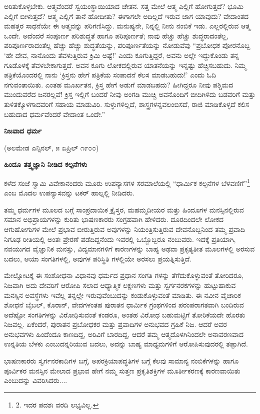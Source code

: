 ಅರಿತುಕೊಳ್ಳಬೇಕು. ಆತ್ಮವೆಂದರೆ ಸ್ವಯಂಸ್ಥಾಯಿಯಾದ ಚೇತನ. ಸತ್ತ ಮೇಲೆ ಆತ್ಮ ಎಲ್ಲಿಗೆ ಹೋಗುತ್ತದೆ? ಭೂಮಿ ಎಲ್ಲಿಗೆ ಬೀಳುತ್ತದೆ? ಆತ್ಮ ಎಲ್ಲಿಗೆ ತಾನೆ ಹೋದೀತು? ಈಗಾಗಲೇ ಅದಿಲ್ಲದೆ ಇರುವ ಜಾಗ ಯಾವುದು? ವೇದಾಂತದ ಮಹತ್ತರ ಸಾಧನೆಯೇ ಈ ಆತ್ಮವನ್ನು ಪರಿಗಣಿಸಿದ್ದು. ಮನುಷ್ಯನೇ, ನಿನ್ನಲ್ಲಿ ನೀನು ನಂಬಿಕೆ ಇಡು. ಎಲ್ಲರಲ್ಲಿರುವ ಆತ್ಮ ಒಂದೇ. ಅದೆಂದರೆ ಸಂಪೂರ್ಣ ಪರಿಶುದ್ಧತೆ ಹಾಗೂ ಪರಿಪೂರ್ಣತೆ; ನಾವು ಹೆಚ್ಚು ಹೆಚ್ಚು ಶುದ್ಧರಾದಂತೆಲ್ಲ, ಪರಿಪೂರ್ಣರಾದಂತೆಲ್ಲ ಹೆಚ್ಚು ಹೆಚ್ಚು ಶುದ್ಧತೆಯನ್ನು, ಪರಿಪೂರ್ಣತೆಯನ್ನು ನೋಡುವೆವು “ಪ್ರಬೋಧಕ ಪೋರನೊಬ್ಬ ‘ಹೇ ದೇವ, ನಾನೊಂದು ತೆವಳುತ್ತಿರುವ ಕ್ರಿಮಿ ಅಷ್ಟೆ!’ ಎಂದು ಕೂಗುತ್ತಿದ್ದರೆ, ಅವನು ಅಲ್ಲೇ ಇದ್ದುಕೊಂಡು ತನ್ನ ಗೂಡೊಳಕ್ಕೆ ತೆವಳಬೇಕಾಗುತ್ತದೆ. ಅವನ ಕೂಗು ಲೋಕದಲ್ಲಿರುವ ಯಾತನೆಯನ್ನು ಇನ್ನಷ್ಟು ಹೆಚ್ಚಿಸಬಹುದು. ನಿಮ್ಮ ಪತ್ರಿಕೆಯೊಂದರಲ್ಲಿ ನಾನು ‘ಕ್ರಿಸ್ತನು ಹೇಗೆ ಪತ್ರಿಕೆಯ ಸಂಪಾದನೆ ಕೆಲಸ ಮಾಡಬಹುದು!’ ಎಂದು ಓದಿ ನಗುವಂತಾಯಿತು. ಎಂತಹ ಮೂರ್ಖತನ, ಕ್ರಿಸ್ತ ಹೇಗೆ ಅಡುಗೆ ಮಾಡಬಹದು? ಹೀಗಿದ್ದರೂ ನೀವು ಪಶ್ಚಿಮದ ಮುಂದುವರೆದ ಜನರಲ್ಲವೆ! ಕ್ರಿಸ್ತ ಇಲ್ಲಿಗೆ ಬಂದರೆ ನೀವು ಅಂಗಡಿ ಮುಚ್ಚಿ ಅವನೊಂದಿಗೆ ಬೀದಿಗಿಳಿದು ಬಡವರಿಗೆ ಮತ್ತು ತುಳಿತಕ್ಕೊಳಗಾದವರಿಗೆ ಸಹಾಯ ಮಾಡುವಿರಿ. ಸುಳ್ಳುಗಳಿಲ್ಲದೆ, ಶಾಸ್ತ್ರಗಳನ್ನವಲಂಬಿಸದೆ, ರಾಜಿ ಮಾಡಿಕೊಳ್ಳದೆ ಕಲಿಸ ಬಹುದಾದ ಧರ್ಮವೆಂದರೆ ವೇದಾಂತ ಒಂದೇ.”

\begin{center}
\textbf{ನಿಜವಾದ ಧರ್ಮ}
\end{center}

\begin{center}
(ಅಲಮೇಡ ಎನ್ಸಿನಲ್, ೫ ಏಪ್ರಿಲ್ ೧೯೦೦)
\end{center}

\begin{center}
\textbf{ಹಿಂದೂ ತತ್ತ್ವಜ್ಞಾನಿ ನೀಡಿದ ಕಲ್ಪನೆಗಳು}
\end{center}

ಕಳೆದ ಸಂಜೆ ಸ್ವಾಮಿ ವಿವೇಕಾನಂದರು ಮೂರು ಉಪನ್ಯಾಸಗಳ ಸರಮಾಲೆಯಲ್ಲಿ “ಧಾರ್ಮಿಕ ಕಲ್ಪನೆಗಳ ಬೆಳವಣಿಗೆ”\footnote{2. ಇದರ ಪದಶಃ ವರದಿ ಲಭ್ಯವಿಲ್ಲ.} ಎಂಬ ಮೊದಲ ಉಪನ್ಯಾಸವನ್ನು ಟಕರ್ ಹಾಲ್ನಲ್ಲಿ ನೀಡಿದರು.

ತಮ್ಮ ಧರ್ಮಗಳ ಮೂಲದ ಬಗ್ಗೆ ಸಾಂಪ್ರದಾಯಿಕ ಕ್ರೈಸ್ತರ, ಮಹಮ್ಮದೀಯರ ಮತ್ತು ಹಿಂದೂಗಳ ಮನಸ್ಸಿನಲ್ಲಿರುವ ಸಮಾನ ಅಭಿಪ್ರಾಯಗಳನ್ನು ಕುರಿತು ಭಾಷಣಕಾರರು ಸಂಗ್ರಹವಾಗಿ ಹೇಳಿದರು. ದೂರದಿಂದಲೇ ಲೋಕದ ಆಗುಹೋಗುಗಳ ಮೇಲೆ ಪ್ರಭಾವ ಬೀರುತ್ತಿರುವ ಅವುಗಳನ್ನು ನಿಯಂತ್ರಿಸುತ್ತಿರುವ ದೇವನೊಬ್ಬನಿಂದ ತಮ್ಮ ಪ್ರವಾದಿ ನಿಗೂಢ ರೀತಿಯಲ್ಲಿ ಅಂತಃ ಪ್ರೇರಣೆ ಪಡೆದಿದ್ದನೆಂದು ಇವರಲ್ಲಿ ಒಬ್ಬೊಬ್ಬರೂ ನಂಬುವರು. ಇದಕ್ಕೆ ಪ್ರತಿಯಾಗಿ, ನವಯುಗದ ವೈಜ್ಞಾನಿಕ ಮನಸ್ಸು, ವಿದ್ಯಮಾನಗಳಿಗೆ ಕಾರಣಗಳನ್ನು ಬಾಹ್ಯ ಅಥವಾ ಪ್ರಕೃತ್ಯತೀತ ಮೂಲಗಳಲ್ಲಿ ಅರಸುವ ಬದಲು, ಆಯಾ ಸಂಗತಿಗಳಲ್ಲಿ, ಅವುಗಳ ಪರಿಸ್ಥಿತಿ ಗಳಲ್ಲಿಯೇ ಅರಸಲು ಪ್ರಯತ್ನಿಸುತ್ತಿದೆ.

ಮೇಲ್ನೋಟಕ್ಕೆ ಈ ಸಂಶೋಧನಾ ವಿಧಾನವು ಧರ್ಮದ ಪ್ರಧಾನ ಸಂಗತಿ ಗಳನ್ನು ತೆಗೆದುಕೊಳ್ಳುವಂತೆ ತೋರಿದರೂ, ನಿಜವಾಗಿ ಅದು ದೇವರಿಗೆ ಆರೋಪಿ ಸಲಾದ ಆಧ್ಯಾತ್ಮಿಕ ಲಕ್ಷಣಗಳು ಮತ್ತು ಸ್ವರ್ಗನರಕಗಳನ್ನು ಹುಟ್ಟುಹಾಕುವ ಮನಸ್ಸಿನ ಅವಸ್ಥೆಗಳು ಇವೆಲ್ಲ ತನ್ನಲ್ಲೇ ಇರುವುವೆಂಬುದನ್ನು ಕಂಡುಕೊಳ್ಳುವಂತೆ ಮಾಡಿತು. ಈ ನವೀನ ವೈಚಾರಿಕ ಶೋಧನೆ ಬೈಬಲ್, ಕೊರಾನ್, ವೇದಗಳಂತಹ ಪುರಾತನ ಧಾರ್ಮಿಕ ಗ್ರಂಥಗಳಿಂದ ಪರಂಪರಾಗತವಾಗಿ ಬಂದಿರುವ ಅದೆಷ್ಟೋ ಸಂಗತಿಗಳನ್ನು ವಿರೋಧಿಸುವಂತೆ ಕಂಡರೂ, ಅಂತಹ ವಿರೋಧ ಬಹುಮಟ್ಟಿಗೆ ತೋರಿಕೆಯದೇ ಹೊರತು ನಿಜವಲ್ಲ. ಏಕೆಂದರೆ, ಪುರಾತನ ಪ್ರಬೋಧಕರ ಮತ್ತು ಪ್ರವಾದಿಗಳ ಅನುಭವದ ಗ್ರಹಿಕೆ ನಿಜ. ಆದರೆ ಅವರ ಅನುಭವಗಳು ಹಿಂದೆಂದೂ ಕಾಣದಿದ್ದ, ಅರಿವಿಗೆ ಬಾರದಿದ್ದ, ಆದರೆ ತಮ್ಮ ಆತ್ಮದೊಳಗಿನಿಂದಲೇ ಅನಾವರಣವಾದ ಉನ್ನತಿಯ ಬೆಳಕು ಎಂಬುದನ್ನರಿಯುವ ಬದಲು, ಅದನ್ನು ಬಾಹ್ಯ ಮಾಧ್ಯಮಗಳಿಗೆ ಆರೋಪಿಸುವುದರಲ್ಲಿ ತಪ್ಪಾಗಿದೆ.

ಭಾಷಣಕಾರರು ಸ್ವರ್ಗನರಕಾದಿಗಳ ಬಗ್ಗೆ, ಅಪರಕ್ರಿಯಾಪದ್ಧತಿಗಳ ಬಗ್ಗೆ ಕೆಲವು ಸಾಮಾನ್ಯ ನಂಬಿಕೆಗಳನ್ನು ಹಾಗೂ ಪೂರ್ವಿಕರ ಮನಸ್ಸಿನ ಮೇಲಾದ ಪ್ರಭಾವ ಹೇಗೆ ನಮ್ಮ ಸುತ್ತಣ ಪ್ರಕೃತಿಶಕ್ತಿಗಳ ಮೂರ್ತೀಕರಣಕ್ಕೆ ಕಾರಣವಾಯಿತು ಎಂಬುದನ್ನು ವಿವರಿಸಿದರು....

